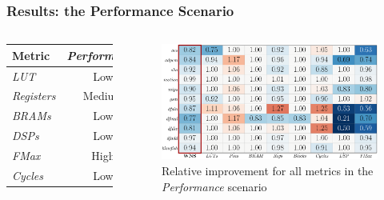 \documentclass[10pt, compress, xcolor={table,xcdraw,usenames}, aspectratio=169]{beamer}
\begin{document}
\begin{frame}
    \frametitle{Results: the Performance Scenario}
    \begin{columns}[T,onlytextwidth]
        \begin{table}[htpb]
            \scriptsize
            \centering
            \begin{tabular}{@{}lcccc@{}}
                \toprule
                Metric & \textit{Performance} \\ \midrule
                \textit{LUT} & \cellcolor[HTML]{DD9583} Low \\
                \textit{Registers} & \cellcolor[HTML]{E3DBB3} Medium \\
                \textit{BRAMs} & \cellcolor[HTML]{DD9583} Low \\
                \textit{DSPs} & \cellcolor[HTML]{DD9583} Low \\
                \textit{FMax} & \cellcolor[HTML]{9B94B6} High \\
                \textit{Cycles} & \cellcolor[HTML]{DD9583} Low \\ \bottomrule
            \end{tabular}
        \end{table}

        \begin{figure}[htpb]
            \centering
            \includegraphics[width=0.8\columnwidth]{heatmap_default_stratixV_perf}
            \caption{Relative improvement for all metrics in the
            \textit{Performance} scenario}
        \end{figure}
    \end{columns}
\end{frame}
\end{document}
